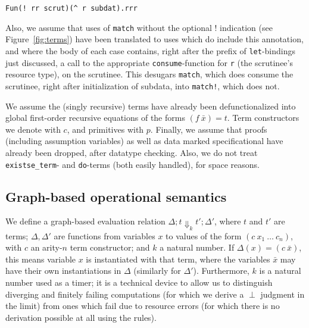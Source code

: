 \documentclass[9pt,natbib]{sigplanconf}
\begin{document}
\begin{verbatim}
Fun(! rr scrut)(^ r subdat).rrr
\end{verbatim}

\noindent Also, we assume that uses of \texttt{match} without the
optional $!$ indication (see Figure~\ref{fig:terms}) have been
translated to uses which do include this annotation, and where the
body of each case contains, right after the prefix of
\texttt{let}-bindings just discussed, a call to the appropriate
\texttt{consume}-function for \texttt{r} (the scrutinee's resource
type), on the scrutinee.  This desugars \texttt{match}, which does
consume the scrutinee, right after initialization of subdata, into
\texttt{match!}, which does not.  

We assume the (singly recursive) terms have already been
defunctionalized into global first-order recursive equations of the
forms $(f\ \bar{x}) = t$.  Term constructors we denote with $c$, and
primitives with $p$. Finally, we assume that proofs (including
assumption variables) as well as data marked specificational have
already been dropped, after datatype checking.  Also, we do not treat
\texttt{existse\_term}- and \texttt{do}-terms (both easily handled),
for space reasons.

\subsection{Graph-based operational semantics}

We define a graph-based evaluation relation $\Delta; t \Downarrow_k
t'; \Delta'$, where $t$ and $t'$ are terms; $\Delta, \Delta'$ are
functions from variables $x$ to values of the form
$(c\ x_1\ \ldots\ c_n)$, with $c$ an arity-$n$ term constructor; and
$k$ a natural number.  If $\Delta(x) = (c\ \bar{x})$, this means
variable $x$ is instantiated with that term, where the variables
$\bar{x}$ may have their own instantiations in $\Delta$ (similarly for
$\Delta'$).  Furthermore, $k$ is a natural number used as a timer; it
is a technical device to allow us to distinguish diverging and
finitely failing computations (for which we derive a $\perp$ judgment
in the limit) from ones which fail due to resource errors (for which
there is no derivation possible at all using the rules).  
\end{document}

